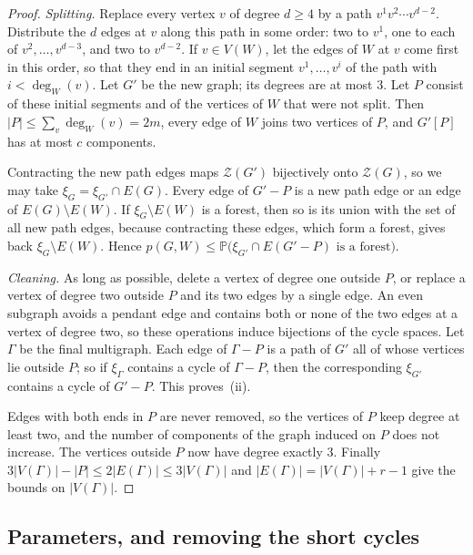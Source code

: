 \documentclass[11pt]{article}
\theoremstyle{definition}
\theoremstyle{remark}
\newcommand{\Z}{\mathcal{Z}}
\newcommand{\PP}{\mathbb{P}}
\newcommand{\sm}{\setminus}
\numberwithin{equation}{section}
\begin{document}
\begin{proof}
\emph{Splitting.} Replace every vertex $v$ of degree $d\ge4$ by a path $v^{1}v^{2}\cdots v^{d-2}$.
Distribute the $d$ edges at $v$ along this path in some order: two to $v^{1}$, one to each of
$v^{2},\dots,v^{d-3}$, and two to $v^{d-2}$. If $v\in V(W)$, let the edges of $W$ at $v$ come first
in this order, so that they end in an initial segment $v^{1},\dots,v^{i}$ of the path with
$i<\deg_W(v)$. Let $G'$ be the new graph; its degrees are at most $3$. Let $P$ consist of these
initial segments and of the vertices of $W$ that were not split. Then $|P|\le\sum_v\deg_W(v)=2m$,
every edge of $W$ joins two vertices of $P$, and $G'[P]$ has at most $c$ components.

Contracting the new path edges maps $\Z(G')$ bijectively onto $\Z(G)$, so we may take
$\xi_G=\xi_{G'}\cap E(G)$. Every edge of $G'-P$ is a new path edge or an edge of $E(G)\sm E(W)$. If
$\xi_G\sm E(W)$ is a forest, then so is its union with the set of all new path edges, because
contracting these edges, which form a forest, gives back $\xi_G\sm E(W)$. Hence
$p(G,W)\le\PP\bigl(\xi_{G'}\cap E(G'-P)\text{ is a forest}\bigr)$.

\emph{Cleaning.} As long as possible, delete a vertex of degree one outside $P$, or replace a vertex
of degree two outside $P$ and its two edges by a single edge. An even subgraph avoids a pendant edge
and contains both or none of the two edges at a vertex of degree two, so these operations induce
bijections of the cycle spaces. Let $\Gamma$ be the final multigraph. Each edge of $\Gamma-P$ is a
path of $G'$ all of whose vertices lie outside $P$; so if $\xi_\Gamma$ contains a cycle of
$\Gamma-P$, then the corresponding $\xi_{G'}$ contains a cycle of $G'-P$. This proves~(ii).

Edges with both ends in $P$ are never removed, so the vertices of $P$ keep degree at least two, and
the number of components of the graph induced on $P$ does not increase. The vertices outside $P$ now
have degree exactly $3$. Finally $3|V(\Gamma)|-|P|\le2|E(\Gamma)|\le3|V(\Gamma)|$ and
$|E(\Gamma)|=|V(\Gamma)|+r-1$ give the bounds on $|V(\Gamma)|$.
\end{proof}

\subsection{Parameters, and removing the short cycles}
\end{document}
